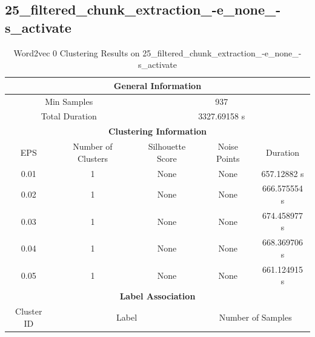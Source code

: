 \label{sec:annexe:clustering_results}

\subsection{25\_filtered\_chunk\_extraction\_-e\_none\_-s\_activate}

\begin{longtable}{|c|c|c|c|c|}
\caption{Word2vec 0 Clustering Results on 25\_filtered\_chunk\_extraction\_-e\_none\_-s\_activate} \label{tab:25_filtered_chunk_extraction_-e_none_-s_activate_word2vec_0_clustering_results}\\
\hline
\multicolumn{5}{|c|}{\textbf{General Information}} \\
\hline
\multicolumn{2}{|c|}{Min Samples} & \multicolumn{3}{c|}{937} \\
\multicolumn{2}{|c|}{Total Duration} & \multicolumn{3}{c|}{3327.69158 s} \\
\hline
\multicolumn{5}{|c|}{\textbf{Clustering Information}} \\
\hline
EPS & Number of Clusters & Silhouette Score & Noise Points & Duration \\
0.01 & 1 & None & None & 657.12882 s\\
0.02 & 1 & None & None & 666.575554 s\\
0.03 & 1 & None & None & 674.458977 s\\
0.04 & 1 & None & None & 668.369706 s\\
0.05 & 1 & None & None & 661.124915 s\\
\hline
\multicolumn{5}{|c|}{\textbf{Label Association}} \\
\hline
Cluster ID & \multicolumn{2}{c|}{Label} & \multicolumn{2}{c|}{Number of Samples} \\
\hline
\end{longtable}


